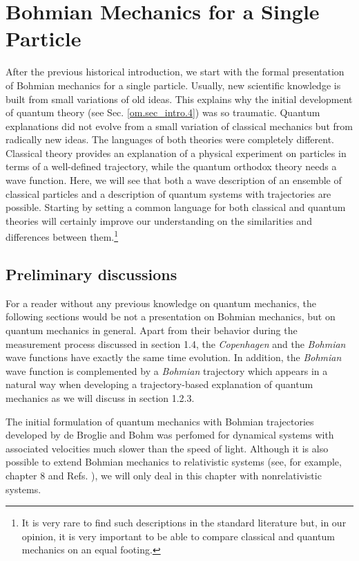 \documentclass[onecolumn,nofootinbib, secnumarabic, amsmath, nobibnotes,12pt,aps,pra]{revtex4-1}
\newcommand{\sref}[1]{Sec. \ref{#1}}
\begin{document}
\vspace*{-1pc}
\section{Bohmian Mechanics for a Single Particle}\label{om.sec_single}

After the previous historical introduction, we start with the formal
presentation of Bohmian mechanics for a single particle. Usually,
new scientific knowledge is built from small variations of old
ideas. This explains why the initial development of quantum theory
(see \sref{om.sec_intro.4}) was so traumatic. Quantum explanations
did not evolve from a small variation of classical mechanics but
from radically new ideas. The languages of both theories were
completely different. Classical theory provides an explanation of a
physical experiment on particles in terms of a well-defined trajectory,
while the quantum orthodox theory needs a wave function. Here, we
will see that both a wave description of an ensemble of classical
particles and a description of quantum systems with trajectories are
possible. Starting by setting a common language for both classical
and quantum theories will certainly improve our understanding on the
similarities and differences between them.\footnote{It is very rare
to find such descriptions in the standard literature but, in our
opinion, it is very important to be able to compare classical and
quantum mechanics on an equal footing.}

\subsection{Preliminary discussions}\label{om.sec_single.1}

For a reader without any previous knowledge on quantum mechanics,
the following sections would be not a presentation on Bohmian
mechanics, but on quantum mechanics in general. Apart from their
behavior during the measurement process discussed in section 1.4,
the \textit{Copenhagen} and the \textit{Bohmian} wave functions have exactly the
same time evolution. In addition, the \textit{Bohmian} wave function is
complemented by a \textit{Bohmian} trajectory which appears in a natural
way when developing a trajectory-based explanation of quantum
mechanics as we will discuss in section 1.2.3.


The initial formulation of quantum mechanics with Bohmian
trajectories developed by de Broglie and Bohm was perfomed for dynamical
systems with associated velocities much slower than the speed of
light. Although it is also possible to extend Bohmian mechanics to
relativistic systems (see, for example, chapter 8 and Refs.
\cite{om.extra6,om.extra7,om.ward}), we will only deal in this
chapter with nonrelativistic systems.
\end{document}
